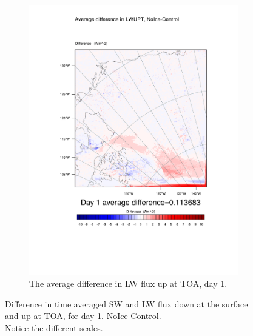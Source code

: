 \begin{figure}
\begin{subfigure}{0.48\textwidth}
		\includegraphics[width=\textwidth]{results/noice/diff_NoIce_LWUPT_Day1.pdf}
		\caption{The average difference in LW flux up at TOA, day 1.}
		\label{subfig:lwup_r2Day1}
	\end{subfigure}
	\caption{Difference in time averaged SW and LW flux down at the surface and up at TOA, for day 1. NoIce-Control.\\Notice the different scales.}
	\label{fig:radiation_r2Day1}
\end{figure}

